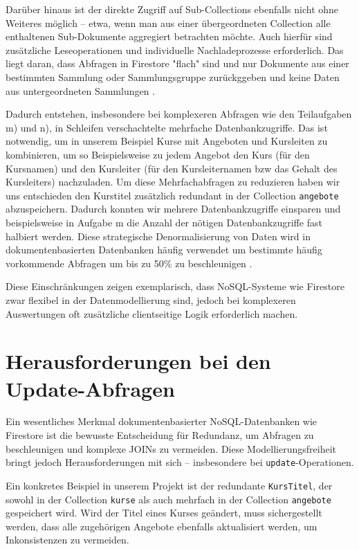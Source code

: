 \documentclass[12pt,a4paper%
              ,oneside     %
              ,titlepage
              ,DIV=13
              ,headinclude
              ,footinclude=false%
              ,cleardoublepage=empty%
              ,parskip=half,
              BCOR=0mm,
              ]{scrreprt}
\begin{document}
Darüber hinaus ist der direkte Zugriff auf Sub-Collections ebenfalls nicht ohne Weiteres möglich – etwa, wenn man aus einer übergeordneten Collection alle enthaltenen Sub-Dokumente aggregiert betrachten möchte. Auch hierfür sind zusätzliche Leseoperationen und individuelle Nachladeprozesse erforderlich. Das liegt daran, dass Abfragen in Firestore "flach" sind und nur Dokumente aus einer bestimmten Sammlung oder Sammlungsgruppe zurückggeben und keine Daten aus untergeordneten Sammlungen \cite{FirebaseComparison.2025}.

Dadurch entstehen, insbesondere bei komplexeren Abfragen wie den Teilaufgaben m) und n), in Schleifen verschachtelte mehrfache Datenbankzugriffe. Das ist notwendig, um in unserem Beispiel Kurse mit Angeboten und Kursleiten zu kombinieren, um so Beispielsweise zu jedem Angebot den Kurs (für den Kursnamen) und den Kursleiter (für den Kursleiternamen bzw das Gehalt des Kursleiters) nachzuladen. Um diese Mehrfachabfragen zu reduzieren haben wir uns entschieden den Kurstitel zusätzlich redundant in der Collection \texttt{angebote} abzuspeichern. Dadurch konnten wir mehrere Datenbankzugriffe einsparen und beispielsweise in Aufgabe m die Anzahl der nötigen Datenbankzugriffe fast halbiert werden. Diese strategische Denormalisierung von Daten wird in dokumentenbasierten Datenbanken häufig verwendet um bestimmte häufig vorkommende Abfragen um bis zu 50\% zu beschleunigen \cite{MoldStud.2025}. 

Diese Einschränkungen zeigen exemplarisch, dass NoSQL-Systeme wie Firestore zwar flexibel in der Datenmodellierung sind, jedoch bei komplexeren Auswertungen oft zusätzliche clientseitige Logik erforderlich machen.

\chapter{Herausforderungen bei den Update-Abfragen}
\label{update-label}

Ein wesentliches Merkmal dokumentenbasierter NoSQL-Datenbanken wie Firestore ist die bewusste Entscheidung für Redundanz, um Abfragen zu beschleunigen und komplexe JOINs zu vermeiden. Diese Modellierungsfreiheit bringt jedoch Herausforderungen mit sich – insbesondere bei \texttt{update}-Operationen.

Ein konkretes Beispiel in unserem Projekt ist der redundante \texttt{KursTitel}, der sowohl in der Collection \texttt{kurse} als auch mehrfach in der Collection \texttt{angebote} gespeichert wird. Wird der Titel eines Kurses geändert, muss sichergestellt werden, dass alle zugehörigen Angebote ebenfalls aktualisiert werden, um Inkonsistenzen zu vermeiden.
\end{document}
